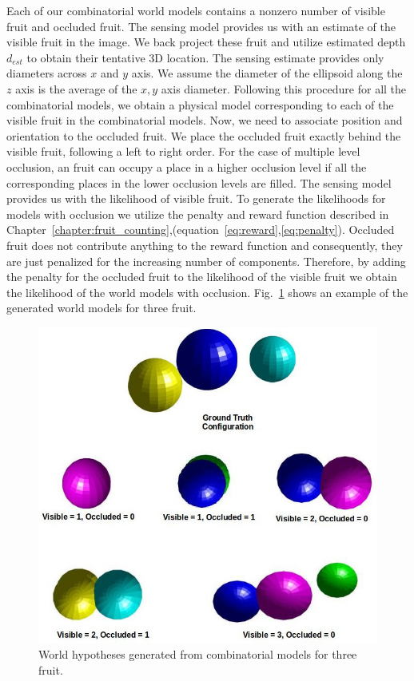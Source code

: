 Each of our combinatorial world models contains a nonzero number of visible fruit and occluded fruit. The sensing model provides us with an estimate of the visible fruit in the image. We back project these fruit and utilize estimated depth $d_{est}$ to obtain their tentative 3D location. The sensing estimate provides only diameters across $x$ and $y$ axis. We assume the diameter of the ellipsoid along the $z$ axis is the average of the $x,y$ axis diameter. Following this procedure for all the combinatorial models, we obtain a physical model corresponding to each of the visible fruit in the combinatorial models. Now, we need to associate position and orientation to the occluded fruit. We place the occluded fruit exactly behind the visible fruit, following a left to right order. For the case of multiple level occlusion, an fruit can occupy a place in a higher occlusion level if all the corresponding places in the lower occlusion levels are filled. The sensing model provides us with the likelihood of visible fruit. To generate the likelihoods for models with occlusion we utilize the penalty and reward function described in Chapter~\ref{chapter:fruit_counting},(equation~\eqref{eq:reward},\eqref{eq:penalty}). Occluded fruit does not contribute anything to the reward function and consequently, they are just penalized for the increasing number of components. Therefore, by adding the penalty for the occluded fruit to the likelihood of the visible fruit we obtain the likelihood of the world models with occlusion. Fig.~\ref{fig:genmodel} shows an example of the generated world models for three fruit.
\begin{figure}[!htbp]
\centering

    \includegraphics[width=.7\textwidth]{figures/active_counting/genmodel.jpg}

\caption[World hypotheses generated from combinatorial models for three fruit.]{ World hypotheses generated from combinatorial models for three fruit.}
\label{fig:genmodel}
\end{figure}


